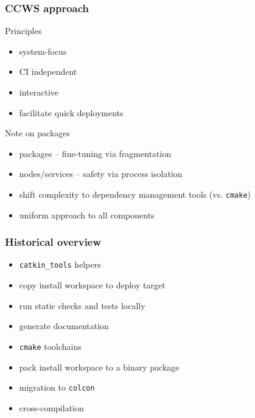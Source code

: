 \documentclass[hyperref={colorlinks=false, breaklinks=true},11pt]{beamer}
\begin{document}
\begin{frame}
    \frametitle{CCWS approach}

    \begin{block}{Principles}
        \begin{itemize}
            \item system-focus
            \item CI independent
            \item interactive
            \item facilitate quick deployments
        \end{itemize}
    \end{block}

    \begin{block}{Note on packages}
        \begin{itemize}
            \item packages -- fine-tuning via fragmentation
            \item nodes/services -- safety via process isolation
            \item shift complexity to dependency management tools (vs. \texttt{cmake})
            \item uniform approach to all components
        \end{itemize}
    \end{block}
\end{frame}

\begin{frame}
    \frametitle{Historical overview}

    \begin{block}{}
        \begin{itemize}
            \item \texttt{catkin\_tools} helpers
            \item copy install workspace to deploy target
            \item run static checks and tests locally
            \item generate documentation
            \item \texttt{cmake} toolchains
            \item pack install workspace to a binary package
            \item migration to \texttt{colcon}
            \item cross-compilation
        \end{itemize}
    \end{block}
\end{frame}
\end{document}
